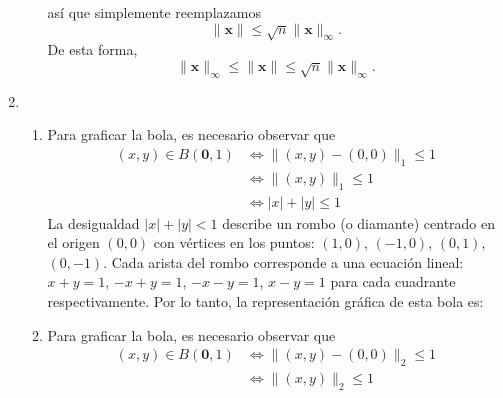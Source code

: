 \begin{enumerate}
\begin{enumerate}
        así que simplemente reemplazamos
        $$\| \mathbf{x} \| \leq \sqrt{n} \| \mathbf{x} \|_{\infty}.$$
        De esta forma,
        $$\| \mathbf{x} \|_{\infty} \leq \| \mathbf{x} \| \leq \sqrt{n} \| \mathbf{x} \|_{\infty}.$$
    \end{enumerate}
    \item \begin{enumerate}
        \item Para graficar la bola, es necesario observar que
        \begin{align*}
            (x, y) \in B(\mathbf{0}, 1) & \Longleftrightarrow \| (x, y) - (0, 0) \|_1 \leq 1 \\
            & \Longleftrightarrow \| (x, y) \|_1 \leq 1 \\
            & \Longleftrightarrow |x| + |y| \leq 1
        \end{align*}
        La desigualdad $|x| + |y| < 1$ describe un rombo (o diamante) centrado en el origen $(0, 0)$ con vértices en los puntos: $(1, 0)$, $(-1, 0)$, $(0, 1)$, $(0, -1)$. Cada arista del rombo corresponde a una ecuación lineal: $x + y = 1$, $-x + y = 1$, $-x - y = 1$, $x - y = 1$ para cada cuadrante respectivamente. Por lo tanto, la representación gráfica de esta bola es:
        \begin{center}
        \end{center}
        \item Para graficar la bola, es necesario observar que
        \begin{align*}
            (x, y) \in B(\mathbf{0}, 1) & \Longleftrightarrow \| (x, y) - (0, 0) \|_2 \leq 1 \\
            & \Longleftrightarrow \| (x, y) \|_2 \leq 1 \\

\end{align*}
\end{enumerate}
\end{enumerate}
